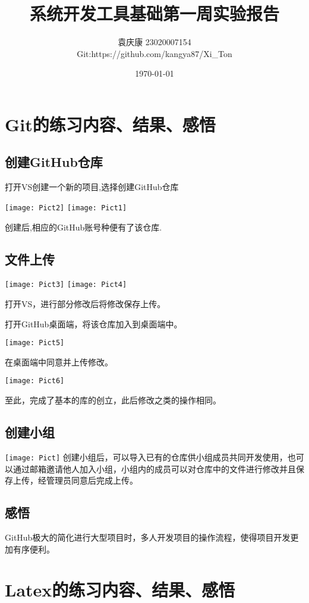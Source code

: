 \documentclass[a4paper, 12pt]{article}
\begin{document}
\title{\textbf{系统开发工具基础第一周实验报告}}
\author{袁庆康 23020007154 \\Git:https://github.com/kangya87/Xi\_Ton}
\date{\today}
\maketitle
\section{\large Git的练习内容、结果、感悟}
\subsection{\small 创建GitHub仓库}
打开VS创建一个新的项目,选择创建GitHub仓库

\texttt{[image: Pict2]}
\texttt{[image: Pict1]}

创建后,相应的GitHub账号种便有了该仓库.
\subsection{\small 文件上传}
\texttt{[image: Pict3]}
\texttt{[image: Pict4]}

打开VS，进行部分修改后将修改保存上传。

打开GitHub桌面端，将该仓库加入到桌面端中。

\texttt{[image: Pict5]}

在桌面端中同意并上传修改。

\texttt{[image: Pict6]}

至此，完成了基本的库的创立，此后修改之类的操作相同。
\subsection{\small 创建小组}
\texttt{[image: Pict]}
创建小组后，可以导入已有的仓库供小组成员共同开发使用，也可以通过邮箱邀请他人加入小组，小组内的成员可以对仓库中的文件进行修改并且保存上传，经管理员同意后完成上传。
\subsection{\small 感悟}
GitHub极大的简化进行大型项目时，多人开发项目的操作流程，使得项目开发更加有序便利。

\section{\large Latex的练习内容、结果、感悟}
\end{document}
